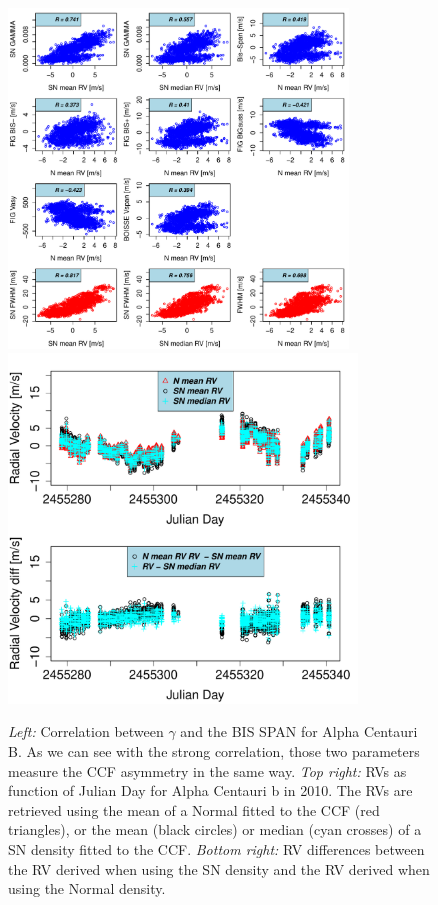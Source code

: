 \documentclass{aa}
\begin{document}
%
\begin{figure}[htbp]
\begin{center}
\includegraphics[height = 3.55in]{HD12862_[2]gamma_vs_bisspan.pdf} 
\includegraphics[height = 3.65in]{HD12862_[2]RadialVelocityDifferences.pdf} 
   \caption{\emph{Left: }Correlation between $\gamma$ and the BIS SPAN for Alpha Centauri B. As we can see with the strong correlation, those two parameters measure the CCF asymmetry in the same way. \emph{Top right:} RVs as function of Julian Day for Alpha Centauri b in 2010. The RVs are retrieved using the mean of a Normal fitted to the CCF (red triangles), or the mean (black circles) or median (cyan crosses) of a SN density fitted to the CCF. \emph{Bottom right:} RV differences between the RV derived when using the SN density and the RV derived when using the Normal density.}
   \label{fig:alphacent:corr.gamma}
\end{center}
\end{figure}
%
\end{document}
